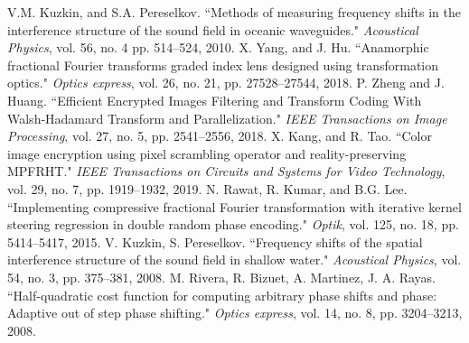 \documentclass[journal]{IEEEtran}
\begin{document}
\begin{thebibliography}{1}
V.M. Kuzkin, and S.A. Pereselkov. ``Methods of measuring frequency shifts in the interference structure of the sound field in oceanic waveguides." \emph{Acoustical Physics}, vol. 56, no. 4 pp. 514--524, 2010.
X. Yang, and J. Hu. ``Anamorphic fractional Fourier transforms graded index lens designed using transformation optics." \emph{Optics express}, vol. 26, no. 21, pp. 27528--27544, 2018.
P. Zheng and J. Huang. ``Efficient Encrypted Images Filtering and Transform Coding With Walsh-Hadamard Transform and Parallelization." \emph{IEEE Transactions on Image Processing}, vol. 27, no. 5, pp. 2541--2556, 2018.
X. Kang, and R. Tao. ``Color image encryption using pixel scrambling operator and reality-preserving MPFRHT." \emph{IEEE Transactions on Circuits and Systems for Video Technology}, vol. 29, no. 7, pp. 1919--1932, 2019.
N. Rawat, R. Kumar, and B.G. Lee. ``Implementing compressive fractional Fourier transformation with iterative kernel steering regression in double random phase encoding." \emph{Optik}, vol. 125, no. 18, pp. 5414--5417, 2015.
V. Kuzkin, S. Pereselkov. ``Frequency shifts of the spatial interference structure of the sound field in shallow water." \emph{Acoustical Physics}, vol. 54, no. 3, pp. 375--381, 2008.
M. Rivera, R. Bizuet, A. Martinez, J. A. Rayas. ``Half-quadratic cost function for computing arbitrary phase shifts and phase: Adaptive out of step phase shifting." \emph{Optics express}, vol. 14, no. 8, pp. 3204--3213, 2008.
\end{thebibliography}

%

\end{document}
